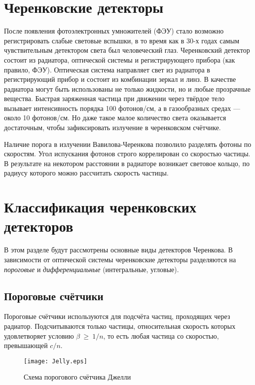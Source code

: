 \begin{Diplom-Main}
	\section{Черенковские детекторы}
	\label{sec:section}
	После появления фотоэлектронных умножителей (ФЭУ) стало возможно регистрировать слабые световые вспышки, в то время как в 30-х годах самым чувствительным детектором света был человеческий глаз.
	Черенковский детектор состоит из радиатора, оптической системы и регистрирующего прибора (как правило, ФЭУ).	
	Оптическая система направляет свет из радиатора в регистрирующий прибор и состоит из комбинации зеркал и линз. 
	В качестве радиатора могут быть использованы не только жидкости, но и любые прозрачные вещества.
	Быстрая заряженная частица при движении через твёрдое тело вызывает интенсивность порядка 100 фотонов/см, а в газообразных средах --- около 10 фотонов/см. Но даже такое малое количество света оказывается достаточным, чтобы зафиксировать излучение в черенковском счётчике. 
	
	Наличие порога в излучении Вавилова-Черенкова позволило разделять фотоны по скоростям.
	Угол испускания фотонов строго коррелирован со скоростью частицы. В результате на некотором расстоянии в радиаторе возникает световое кольцо, по радиусу которого можно рассчитать скорость частицы.
	
	\section{Классификация черенковских детекторов} 
	\label{sec:section}
	В этом разделе будут рассмотрены основные виды детекторов Черенкова. 
	В зависимости от оптической системы черенковские детекторы разделяются на  {\em пороговые} и {\em дифференциальные} (интегральные, угловые). 
	
	\subsection{Пороговые счётчики}
	\label{sec:subsection}
	Пороговые счётчики используются для подсчёта частиц, проходящих через радиатор. Подсчитываются только частицы, относительная скорость которых удовлетворяет условию $ \beta~\geq~1/n $, то есть любая частица со скоростью, превышающей $ c/n $.
	\begin{figure}
	
	\centering\texttt{[image: Jelly.eps]}
	\caption{Схема порогового счётчика Джелли} \label{Jelly-counter}
	\end{figure}


\end{Diplom-Main}
